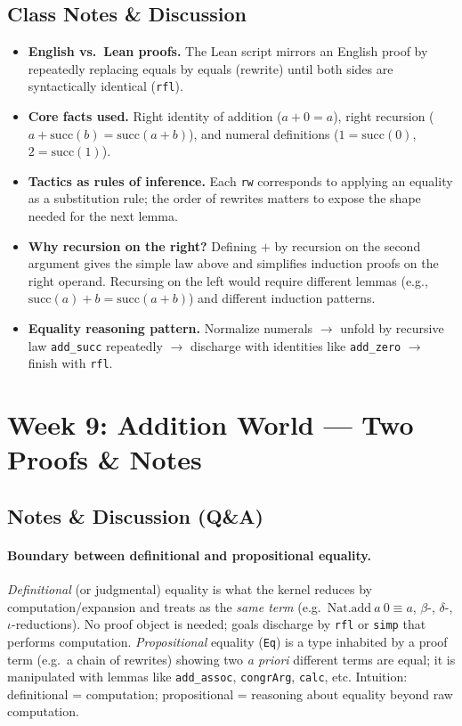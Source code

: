 \documentclass{article}
\theoremstyle{theorem}
\theoremstyle{definition}
\theoremstyle{remark}
\begin{document}
\subsection{Class Notes \& Discussion}
\begin{itemize}
  \item \textbf{English vs.\ Lean proofs.} The Lean script mirrors an English proof by repeatedly replacing equals by equals (rewrite) until both sides are syntactically identical (\texttt{rfl}).
  \item \textbf{Core facts used.} Right identity of addition ($a+0=a$), right recursion ($a+\mathrm{succ}(b)=\mathrm{succ}(a+b)$), and numeral definitions ($1=\mathrm{succ}(0)$, $2=\mathrm{succ}(1)$).
  \item \textbf{Tactics as rules of inference.} Each \texttt{rw} corresponds to applying an equality as a substitution rule; the order of rewrites matters to expose the shape needed for the next lemma.
  \item \textbf{Why recursion on the right?} Defining $+$ by recursion on the second argument gives the simple law above and simplifies induction proofs on the right operand. Recursing on the left would require different lemmas (e.g., $\mathrm{succ}(a)+b=\mathrm{succ}(a+b)$) and different induction patterns.
  \item \textbf{Equality reasoning pattern.} Normalize numerals $\to$ unfold by recursive law \texttt{add\_succ} repeatedly $\to$ discharge with identities like \texttt{add\_zero} $\to$ finish with \texttt{rfl}.
\end{itemize}
\section{Week 9: Addition World — Two Proofs \& Notes}

\subsection{Notes \& Discussion (Q\&A)}

\paragraph{Boundary between definitional and propositional equality.}
\emph{Definitional} (or judgmental) equality is what the kernel reduces by computation/expansion and treats as the \emph{same term} (e.g.\ $\mathrm{Nat.add}\ a\ 0 \equiv a$, $\beta$-, $\delta$-, $\iota$-reductions). No proof object is needed; goals discharge by \texttt{rfl} or \texttt{simp} that performs computation.  
\emph{Propositional} equality (\texttt{Eq}) is a type inhabited by a proof term (e.g.\ a chain of rewrites) showing two \emph{a priori} different terms are equal; it is manipulated with lemmas like \texttt{add\_assoc}, \texttt{congrArg}, \texttt{calc}, etc. Intuition: definitional = computation; propositional = reasoning about equality beyond raw computation.
\end{document}
